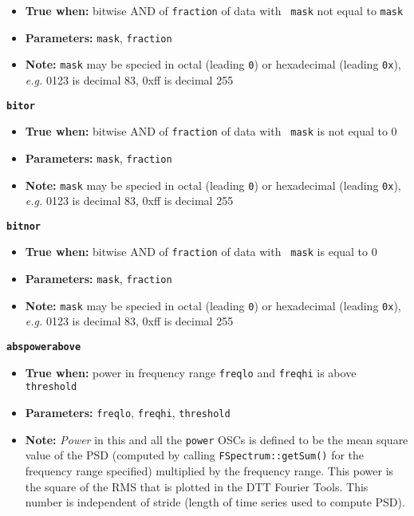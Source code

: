 {\begin{itemize}
\item \textbf{True when:} bitwise AND of \texttt{fraction} of data with \texttt{
    mask} not equal to \texttt{mask}
\item \textbf{Parameters:} \texttt{mask}, \texttt{fraction}
\item \textbf{Note:} \texttt{mask} may be specied in octal (leading
  \texttt{0})  or hexadecimal (leading \texttt{0x}),
  \textit{e.g.} 0123 is decimal 83, 0xff is decimal 255
\end{itemize}

{\large\texttt{\textbf{bitor}}}

\begin{itemize}
\item \textbf{True when:} bitwise AND of \texttt{fraction} of data with \texttt{
    mask} is not equal to 0
\item \textbf{Parameters:} \texttt{mask}, \texttt{fraction}
\item \textbf{Note:} \texttt{mask} may be specied in octal (leading
  \texttt{0})  or hexadecimal (leading \texttt{0x}),  \textit{e.g.} 0123
  is decimal 83, 0xff is decimal 255   
\end{itemize}


{\large\texttt{\textbf{bitnor}}}

\begin{itemize}
\item \textbf{True when:} bitwise AND of \texttt{fraction} of data with \texttt{
    mask} is equal to 0
\item \textbf{Parameters:} \texttt{mask}, \texttt{fraction}
\item \textbf{Note:} \texttt{mask} may be specied in octal (leading
  \texttt{0}) or hexadecimal (leading \texttt{0x}),
  \textit{e.g.} 0123 is decimal 83, 0xff is decimal 255  
\end{itemize}


{\large\texttt{\textbf{abspowerabove}}}

\begin{itemize}
\item \textbf{True when:}  power in frequency range \texttt{freqlo}
  and \texttt{freqhi} is above \texttt{threshold}

\item \textbf{Parameters:} \texttt{freqlo}, \texttt{freqhi}, \texttt{threshold}
\item \textbf{Note:} \textit{Power} in this and all the \texttt{power}
  OSCs is defined to be the mean square value of the PSD
  (computed by calling \texttt{FSpectrum::getSum()} for the
  frequency range specified) multiplied by the frequency range.  This
  power is the square of the RMS that is plotted in the DTT Fourier
  Tools. This number is independent of stride (length of time series
  used to compute PSD). 
\end{itemize}


}
